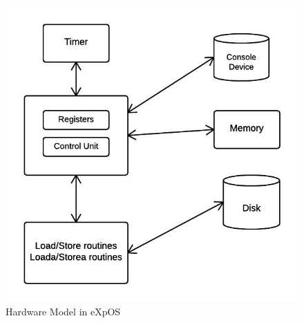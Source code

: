 \begin{figure}[ht]
\centering
\includegraphics[scale=0.75]{figures/hw_model.jpg}
\caption{\footnotesize Hardware Model in eXpOS}
\end{figure}
